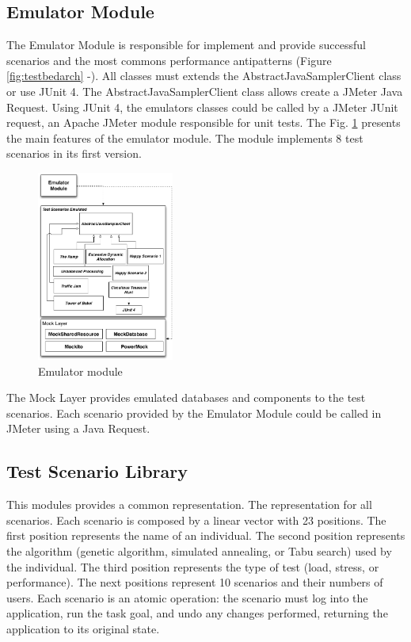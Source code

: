\subsection{Emulator Module}

The Emulator Module is responsible for implement and provide successful scenarios and the most commons performance antipatterns (Figure \ref{fig:testbedarch}  -). All classes must extends the AbstractJavaSamplerClient class or use JUnit 4. The AbstractJavaSamplerClient class allows create a JMeter Java Request.  Using JUnit 4, the emulators classes could be called by a JMeter JUnit request, an Apache JMeter module responsible for unit tests. The Fig. \ref{fig:emulator} presents the main features of the emulator module. The module implements 8 test scenarios in its first version.

\begin{figure}[h]
\centering
\includegraphics[width=0.4\textwidth]{./images/emulator.png}
\caption{Emulator module}
\label{fig:emulator}
\end{figure}  

The Mock Layer provides emulated databases and components to the test scenarios. Each scenario provided by the Emulator Module could be called in JMeter using a Java Request. 

\subsection{Test Scenario Library}

This modules provides a common representation. The representation for all scenarios. Each scenario is composed by a linear vector with 23 positions. The first position represents the name of an individual. The second position represents the algorithm (genetic algorithm, simulated annealing, or Tabu search) used by the individual. The third position represents the type of test (load, stress, or performance). The next positions represent 10 scenarios and their numbers of users. Each scenario is an atomic operation: the scenario must log into the application, run the task goal, and undo any changes performed, returning the application to its original state.

